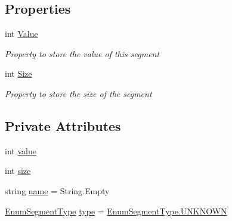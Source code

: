 \subsection*{Properties}
\begin{DoxyCompactItemize}
\item 
int \hyperlink{class_c_p_u___o_s___simulator_1_1_compiler_1_1_instruction_segment_a1e8c5f60cda7233d75e61d44cc43b6b8}{Value}
\begin{DoxyCompactList}\small\item\em Property to store the value of this segment \end{DoxyCompactList}\item 
int \hyperlink{class_c_p_u___o_s___simulator_1_1_compiler_1_1_instruction_segment_a6bdea24d923f03277868b53412a6a424}{Size}
\begin{DoxyCompactList}\small\item\em Property to store the size of the segment \end{DoxyCompactList}\end{DoxyCompactItemize}
\subsection*{Private Attributes}
\begin{DoxyCompactItemize}
\item 
int \hyperlink{class_c_p_u___o_s___simulator_1_1_compiler_1_1_instruction_segment_acdf33d1614b2f7c9125f97793d0b6f8b}{value}
\item 
int \hyperlink{class_c_p_u___o_s___simulator_1_1_compiler_1_1_instruction_segment_a3fbe26c38889c028d98a423f91824a9f}{size}
\item 
string \hyperlink{class_c_p_u___o_s___simulator_1_1_compiler_1_1_instruction_segment_a00b501a442f98f8541515c708eda0b2f}{name} = String.\+Empty
\item 
\hyperlink{namespace_c_p_u___o_s___simulator_1_1_compiler_aa05e0a6530329354660230dd223cca81}{Enum\+Segment\+Type} \hyperlink{class_c_p_u___o_s___simulator_1_1_compiler_1_1_instruction_segment_aa6b21639fca4949423b6a4d0473450be}{type} = \hyperlink{namespace_c_p_u___o_s___simulator_1_1_compiler_ada8d93b571fa15a0f2eac8c9647a89fea696b031073e74bf2cb98e5ef201d4aa3}{Enum\+Segment\+Type.\+U\+N\+K\+N\+O\+W\+N}
\end{DoxyCompactItemize}


